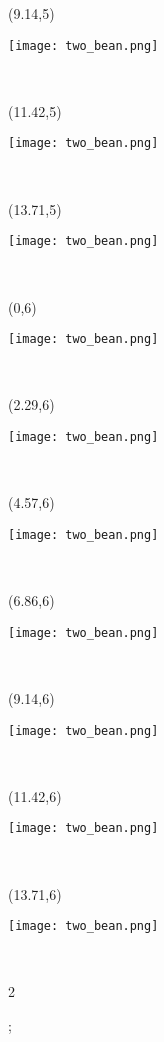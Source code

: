 \documentclass[a4paper]{article}
\newcommand{\myXtwoBean}[0]{
\texttt{[image: two\_bean.png]}
}
\newcommand{\mycard}[5]{%
	\tiny #1 #2
	\hspace{-0.75cm} \large#3\\
}
\begin{document}
\begin{textblock}{2.29}(9.14,5)
\mycard{}{}{
\myXtwoBean
}{}{} 
\end{textblock}

\begin{textblock}{2.29}(11.42,5)
\mycard{}{}{
\myXtwoBean
}{}{} 
\end{textblock}

\begin{textblock}{2.29}(13.71,5)
\mycard{}{}{
\myXtwoBean
}{}{} 
\end{textblock}


\begin{textblock}{2.29}(0,6)
\mycard{}{}{
\myXtwoBean
}{}{} 
\end{textblock}

\begin{textblock}{2.29}(2.29,6)
\mycard{}{}{
\myXtwoBean
}{}{} 
\end{textblock}

\begin{textblock}{2.29}(4.57,6)
\mycard{}{}{
\myXtwoBean
}{}{} 
\end{textblock}

\begin{textblock}{2.29}(6.86,6)
\mycard{}{}{
\myXtwoBean
}{}{} 
\end{textblock}

\begin{textblock}{2.29}(9.14,6)
\mycard{}{}{
\myXtwoBean
}{}{} 
\end{textblock}

\begin{textblock}{2.29}(11.42,6)
\mycard{}{}{
\myXtwoBean
}{}{} 
\end{textblock}

\begin{textblock}{2.29}(13.71,6)
\mycard{}{}{
\myXtwoBean
}{}{} 
\end{textblock}









\begin{tiny}2\end{tiny};
\end{document}
